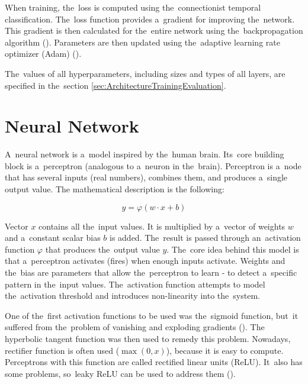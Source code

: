 When training, the~loss is computed using the~connectionist temporal classification. The~loss function provides a~gradient for improving the~network. This gradient is then calculated for the~entire network using the~backpropagation algorithm (\cite{Goodfellow-et-al-2016}). Parameters are then updated using the~adaptive learning rate optimizer (Adam) (\cite{AdamOptimizer}).

The~values of all hyperparameters, including sizes and types of all layers, are specified in the~section \ref{sec:ArchitectureTrainingEvaluation}.


\section{Neural Network}

A~neural network is a~model inspired by the~human brain. Its~core building block is a~perceptron (analogous to a~neuron in the~brain). Perceptron is a~node that has several inputs (real numbers), combines them, and produces a~single output value. The mathematical description is the following:

$$
    y = \varphi(w \cdot x + b)
$$

Vector $x$ contains all the~input values. It is multiplied by a~vector of weights $w$ and a~constant scalar bias $b$ is added. The~result is passed through an~activation function $\varphi$ that produces the~output value $y$. The~core idea behind this model is that a~perceptron activates (fires) when enough inputs activate. Weights and the~bias are parameters that allow the~perceptron to learn - to detect a~specific pattern in the~input values. The~activation function attempts to model the~activation threshold and introduces non-linearity into the~system.

One of the~first activation functions to be used was the~sigmoid function, but~it suffered from the~problem of vanishing and exploding gradients (\cite{VanishingGradient}). The hyperbolic tangent function was then used to remedy this problem. Nowadays, rectifier function is often used ($\max(0, x)$), because it is easy to compute. Perceptrons with this function are called rectified linear units (ReLU). It~also has some problems, so~leaky ReLU can be used to address them (\cite{Maas2013RectifierNI}).


